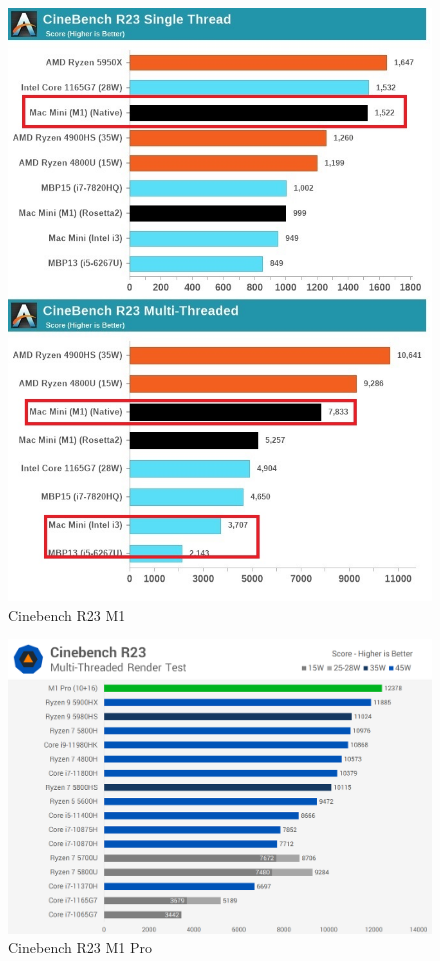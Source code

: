 \begin{figure}[!htb]
	\centering
	\includegraphics[width=\linewidth]{img/m1cinebenchr23.jpg}
	\caption{Cinebench R23 M1 \autocite{Frumusanu2020a}}
\end{figure}
\begin{figure}[!htb]
	\centering
	\includegraphics[width=\linewidth]{img/m1procinebenchr23.jpg}
	\caption{Cinebench R23 M1 Pro \autocite{Schiesser2021}}
\end{figure}

